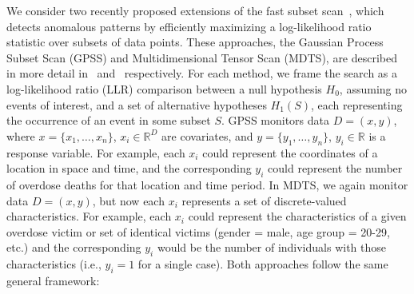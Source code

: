 \documentclass{acm_proc_article-sp}
\begin{document}
We consider two recently proposed extensions of the fast subset scan~\cite{neill2012fast}, which detects anomalous patterns by efficiently maximizing a log-likelihood ratio statistic over subsets of data points.  These approaches, the Gaussian Process Subset Scan (GPSS) and Multidimensional Tensor Scan (MDTS), are described in more detail in~\cite{herlands2017} and~\cite{neill2017overdose} respectively.  For each method, we frame the search as a log-likelihood ratio (LLR) comparison between a null hypothesis $H_0$, assuming no events of interest, and a set of alternative hypotheses $H_1(S)$, each representing the occurrence of an event in some subset $S$.
GPSS monitors data $D = (x,y)$, where $x = \{x_1,\dots,x_n\}$, $x_i \in \mathbb{R}^D$ are covariates, and $y = \{y_1,\dots,y_n\}$, $y_i \in \mathbb{R}$ is a response variable.  For example, each $x_i$ could represent the coordinates of a location in space and time, and the corresponding $y_i$ could represent the number of overdose deaths for that location and time period.  In MDTS,
we again monitor data $D = (x,y)$, but now each $x_i$ represents a set of discrete-valued characteristics.  For example, each $x_i$ could represent the characteristics of a given overdose victim or set of identical victims (gender = male, age group = 20-29, etc.) and the corresponding $y_i$ would be the number of individuals with those characteristics (i.e., $y_i = 1$ for a single case).  Both approaches follow the same general framework:
\end{document}
